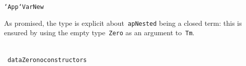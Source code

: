 \documentclass[9pt,authoryear]{sigplanconf}
\begin{document}
{{}\vphantom{$\{$}}\texttt{\mbox{\hspace{0.50em}}}\texttt{\mbox{\hspace{0.50em}}}\texttt{\mbox{\hspace{0.50em}}}\texttt{\mbox{\hspace{0.50em}}}\texttt{\mbox{\hspace{0.50em}}}\texttt{\mbox{\hspace{0.50em}}}\texttt{\mbox{\hspace{0.50em}}}\texttt{\mbox{\hspace{0.50em}}}\texttt{\mbox{\hspace{0.50em}}}\texttt{\mbox{\hspace{0.50em}}}\texttt{\mbox{\hspace{0.50em}}}\texttt{\mbox{\hspace{0.50em}}}\texttt{\mbox{\hspace{0.50em}}}\texttt{\mbox{\hspace{0.50em}}}\texttt{\mbox{\hspace{0.50em}}}\texttt{\mbox{\hspace{0.50em}}}\texttt{\mbox{\hspace{0.50em}}}\texttt{{`}App{`}}\texttt{\mbox{\hspace{0.50em}}}\texttt{Var}\texttt{\mbox{\hspace{0.50em}}}\texttt{\makebox[1.22ex][l]{$ {(} $}}\texttt{New}\texttt{\mbox{\hspace{0.50em}}}\texttt{\makebox[1.22ex][l]{$ {(} $}}\texttt{\makebox[1.22ex][r]{$ {)} $}}\texttt{\makebox[1.22ex][r]{$ {)} $}}\texttt{{\nopagebreak \newline%
}\vphantom{$\{$}}%


%
As promised, the type is explicit about{~}\texttt{apNested} being a closed
    term{:} this is ensured by using the empty type{~}\texttt{Zero} as an
    argument to{~}\texttt{Tm}.%


{\nopagebreak }

%
%
%
~\\~\vphantom{$\{$}\texttt{data}\texttt{\mbox{\hspace{0.50em}}}\texttt{Zero}\texttt{\mbox{\hspace{0.50em}}}\texttt{\makebox[1.22ex][c]{-}\makebox[1.22ex][c]{-}\mbox{\hspace{0.50em}}no\mbox{\hspace{0.50em}}constructors}\texttt{{\nopagebreak \newline%
}\vphantom{$\{$}}%
\end{document}
